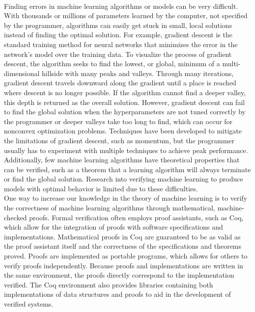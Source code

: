 \\Finding errors in machine learning algorithms or models can be very difficult. With thousands or millions of parameters learned by the computer, not specified by the programmer, algorithms can easily get stuck in small, local solutions instead of finding the optimal solution. For example, gradient descent is the standard training method for neural networks that minimizes the error in the network's model over the training data. To visualize the process of gradient descent, the algorithm seeks to find the lowest, or global, minimum of a multi-dimensional hillside with many peaks and valleys. Through many iterations, gradient descent travels downward along the gradient until a place is reached where descent is no longer possible. If the algorithm cannot find a deeper valley, this depth is returned as the overall solution. However, gradient descent can fail to find the global solution when the hyperparameters are not tuned correctly by the programmer or deeper valleys take too long to find, which can occur for nonconvex optimization problems. Techniques have been developed to mitigate the limitations of gradient descent, such as momentum, but the programmer usually has to experiment with multiple techniques to achieve peak performance. Additionally, few machine learning algorithms have theoretical properties that can be verified, such as a theorem that a learning algorithm will always terminate or find the global solution. Research into verifying machine learning to produce models with optimal behavior is limited due to these difficulties.
\\One way to increase our knowledge in the theory of machine learning is to verify the correctness of machine learning algorithms through mathematical, machine-checked proofs. Formal verification often employs proof assistants, such as Coq, which allow for the integration of proofs with software specifications and implementations. Mathematical proofs in Coq are guaranteed to be as valid as the proof assistant itself and the correctness of the specifications and theorems proved. Proofs are implemented as portable programs, which allows for others to verify proofs independently. Because proofs and implementations are written in the same environment, the proofs directly correspond to the implementation verified. The Coq environment also provides libraries containing both implementations of data structures and proofs to aid in the development of verified systems.
